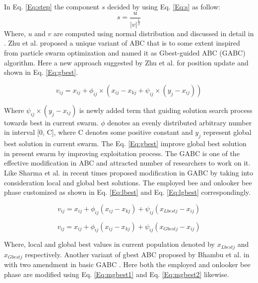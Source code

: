 \documentclass{svproc}
\begin{document}
In Eq. \ref{Eq:step} the component $s$ decided by using Eq. \ref{Eq:s} as follow:
\begin{equation}\label{Eq:s}
  s=\frac{u}{|v|^{\frac{1}{\beta}}}
\end{equation}
Where, $u$ and $v$ are computed using normal distribution and discussed in detail in \cite{sharma2016levy}.
Zhu et al. \cite{zhu2010gbest} proposed a unique variant of ABC that is to some extent inspired from particle swarm optimization and named it as Gbest-guided ABC (GABC) algorithm. Here \cite{zhu2010gbest} a new approach suggested by Zhu et al. for position update and shown in Eq. \ref{Eq:gbest}.

\begin{equation}\label{Eq:gbest}
  v_{ij}=x_{ij}+\phi_{ij} \times (x_{ij}-x_{kj}+\psi_{ij} \times (y_j - x_{ij}))
\end{equation}

Where $\psi_{ij} \times (y_j - x_{ij})$ is newly added term that guiding solution search process towards best in current swarm. $\phi$  denotes an evenly distributed arbitrary number in interval [0, C], where C denotes some positive constant  and $y_j$  represent global best solution in current swarm. The Eq. \ref{Eq:gbest} improve global best solution in present swarm by improving exploitation process. The GABC is one of the effective modification in ABC and attracted number of researchers to work on it. Like Sharma et al. \cite{sharma2016lbest} in recent times proposed modification in GABC by taking into consideration local and global best solutions. The employed bee and onlooker bee phase customized as shown in Eq. \ref{Eq:lbest} and Eq. \ref{Eq:lgbest} correspondingly.

\begin{equation}\label{Eq:lbest}
v_{ij}=x_{ij}+\phi_{ij}(x_{ij}-x_{kj})+\psi_{ij}(x_{Lbestj}-x_{ij})
\end{equation}

\begin{equation}\label{Eq:lgbest}
v_{ij}=x_{ij}+\phi_{ij}(x_{ij}-x_{kj})+\psi_{ij}(x_{Gbestj}-x_{ij})
\end{equation}

Where, local and global best values in current population denoted by $x_{Lbestj}$ and $x_{Gbestj}$ respectively. Another variant of gbest ABC proposed by Bhambu et al. in \cite{bhambu2018modified} with two amendment in basic GABC \cite{zhu2010gbest}. Here both the employed and onlooker bee phase are modified using Eq. \ref{Eq:mgbest1} and Eq. \ref{Eq:mgbest2} likewise.
\end{document}
